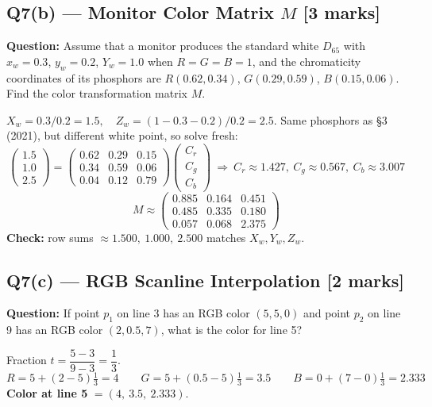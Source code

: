 \documentclass[12pt, a4paper]{article}
\newenvironment{solutionbox}{\begin{mdframed}[style=solutionframe]}{\end{mdframed}}
\newenvironment{answerbox}{\begin{mdframed}[style=answerframe]}{\end{mdframed}}
\begin{document}
\subsection*{Q7(b) --- Monitor Color Matrix $M$ [3 marks]}
\begin{solutionbox}
\textbf{Question:} Assume that a monitor produces the standard white $D_{65}$ with $x_w=0.3$, $y_w=0.2$, $Y_w=1.0$ when $R=G=B=1$, and the chromaticity coordinates of its phosphors are $R(0.62,0.34)$, $G(0.29,0.59)$, $B(0.15,0.06)$. Find the color transformation matrix $M$.
\end{solutionbox}
\begin{answerbox}
$X_w=0.3/0.2=1.5,\quad Z_w=(1-0.3-0.2)/0.2=2.5$. Same phosphors as \S3 (2021), but different white point, so solve fresh:
$$\begin{pmatrix}1.5\\1.0\\2.5\end{pmatrix}=\begin{pmatrix}0.62&0.29&0.15\\0.34&0.59&0.06\\0.04&0.12&0.79\end{pmatrix}\begin{pmatrix}C_r\\C_g\\C_b\end{pmatrix}\ \Rightarrow\ C_r\approx1.427,\ C_g\approx0.567,\ C_b\approx3.007$$
$$M\approx\begin{pmatrix}0.885&0.164&0.451\\0.485&0.335&0.180\\0.057&0.068&2.375\end{pmatrix}$$
\textbf{Check:} row sums $\approx1.500,\ 1.000,\ 2.500$ \checkmark matches $X_w,Y_w,Z_w$.
\end{answerbox}

\subsection*{Q7(c) --- RGB Scanline Interpolation [2 marks]}
\begin{solutionbox}
\textbf{Question:} If point $p_1$ on line 3 has an RGB color $(5,5,0)$ and point $p_2$ on line 9 has an RGB color $(2,0.5,7)$, what is the color for line 5?
\end{solutionbox}
\begin{answerbox}
Fraction $t=\dfrac{5-3}{9-3}=\dfrac{1}{3}$.
$$R=5+(2-5)\tfrac13=4 \qquad G=5+(0.5-5)\tfrac13=3.5 \qquad B=0+(7-0)\tfrac13=2.333$$
\textbf{Color at line 5} $=(4,\ 3.5,\ 2.333)$.
\end{answerbox}
\end{document}

